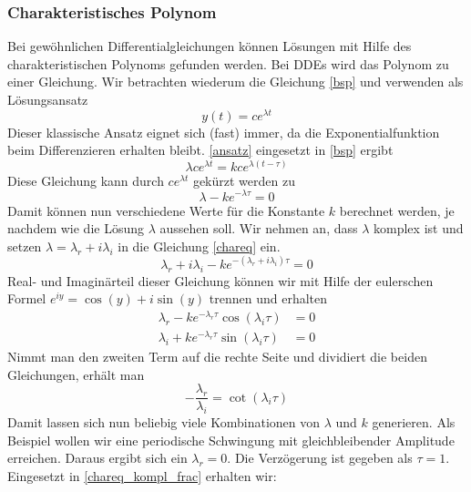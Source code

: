 \subsubsection{Charakteristisches Polynom}
Bei gewöhnlichen Differentialgleichungen können Lösungen mit Hilfe des charakteristischen Polynoms gefunden werden. 
Bei DDEs wird das Polynom zu einer Gleichung. 
Wir betrachten wiederum die Gleichung \eqref{bsp} und verwenden als Lösungsansatz
\begin{equation}\label{ansatz}
	y(t) = ce^{\lambda t}
\end{equation}
Dieser klassische Ansatz eignet sich (fast) immer, da die Exponentialfunktion beim Differenzieren erhalten bleibt. 
\eqref{ansatz} eingesetzt in \eqref{bsp} ergibt
\begin{equation}
	\lambda ce^{\lambda t} = kce^{\lambda (t-\tau )}
\end{equation} 
Diese Gleichung kann durch $ce^{\lambda t}$ gekürzt werden zu
\begin{equation}\label{chareq}
	\lambda  - ke^{-\lambda \tau}= 0
\end{equation} 
Damit können nun verschiedene Werte für die Konstante $k$ berechnet werden, je nachdem wie die Lösung $\lambda$ aussehen soll.
Wir nehmen an, dass $\lambda$ komplex ist und setzen $\lambda = \lambda_r + i\lambda_i$ in die Gleichung \eqref{chareq} ein.
\begin{equation}\label{chareq_kompl}
	\lambda_r + i\lambda_i  - ke^{-(\lambda_r + i\lambda_i) \tau}= 0
\end{equation} 
Real- und Imaginärteil dieser Gleichung können wir mit Hilfe der eulerschen Formel $e^{iy}=\cos(y)+i\sin(y)$ trennen und erhalten
\begin{align}
	\lambda_r - ke^{-\lambda_r\tau}\cos(\lambda_i\tau)&=0 \label{realchar} \\
	\lambda_i + ke^{-\lambda_r\tau}\sin(\lambda_i\tau)&=0 \label{imagchar}
\end{align}
Nimmt man den zweiten Term auf die rechte Seite und dividiert die beiden Gleichungen, erhält man
\begin{equation} \label{chareq_kompl_frac}
	-\frac{\lambda_r}{\lambda_i} = \cot(\lambda_i\tau)
\end{equation}
Damit lassen sich nun beliebig viele Kombinationen von $\lambda$ und $k$ generieren.
Als Beispiel wollen wir eine periodische Schwingung mit gleichbleibender Amplitude erreichen.
Daraus ergibt sich ein $\lambda_r = 0$. 
Die Verzögerung ist gegeben als $\tau = 1$.
Eingesetzt in \eqref{chareq_kompl_frac} erhalten wir:
